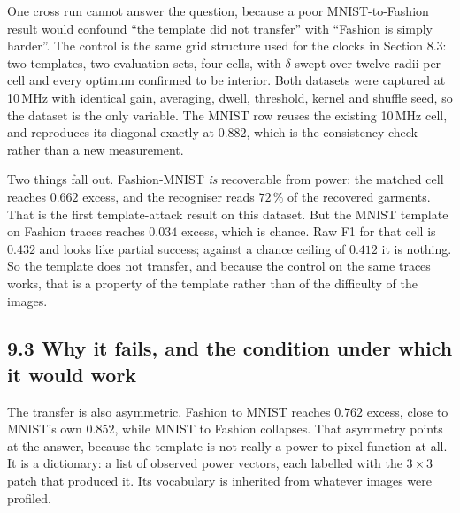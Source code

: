 \documentclass[11pt,a4paper]{article}
\begin{document}
One cross run cannot answer the question, because a poor MNIST-to-Fashion result would
confound ``the template did not transfer'' with ``Fashion is simply harder''. The
control is the same grid structure used for the clocks in Section 8.3: two templates,
two evaluation sets, four cells, with $\delta$ swept over twelve radii per cell and every
optimum confirmed to be interior. Both datasets were captured at 10\,MHz with identical
gain, averaging, dwell, threshold, kernel and shuffle seed, so the dataset is the only
variable. The MNIST row reuses the existing 10\,MHz cell, and reproduces its diagonal
exactly at $0.882$, which is the consistency check rather than a new measurement.

\begin{table}[h]
  \centering
  \small
  
  \caption{Template dataset against attacked dataset, $\delta$ tuned per cell. ``Excess''
  rescales F1 so that $0$ is a label-blind predictor and $1$ is perfect; it is the only
  column comparable across the two datasets.}
  \label{tab:dsgrid}
\end{table}

Two things fall out. Fashion-MNIST \emph{is} recoverable from power: the matched cell
reaches $0.662$ excess, and the recogniser reads $72\,\%$ of the recovered garments.
That is the first template-attack result on this dataset. But the MNIST template on
Fashion traces reaches $0.034$ excess, which is chance. Raw F1 for that cell is $0.432$
and looks like partial success; against a chance ceiling of $0.412$ it is nothing. So
the template does not transfer, and because the control on the same traces works, that
is a property of the template rather than of the difficulty of the images.

\subsection*{9.3 Why it fails, and the condition under which it would work}

The transfer is also asymmetric. Fashion to MNIST reaches $0.762$ excess, close to
MNIST's own $0.852$, while MNIST to Fashion collapses. That asymmetry points at the
answer, because the template is not really a power-to-pixel function at all. It is a
dictionary: a list of observed power vectors, each labelled with the $3\times3$ patch
that produced it. Its vocabulary is inherited from whatever images were profiled.

\begin{table}[h]
  \centering
  \small
  
  \caption{What each template actually contains. Both hold $27\,040$ rows from 40 images;
  they differ in how many of the 512 possible $3\times3$ binary patches ever occurred.}
  \label{tab:patchcov}
\end{table}
\end{document}
